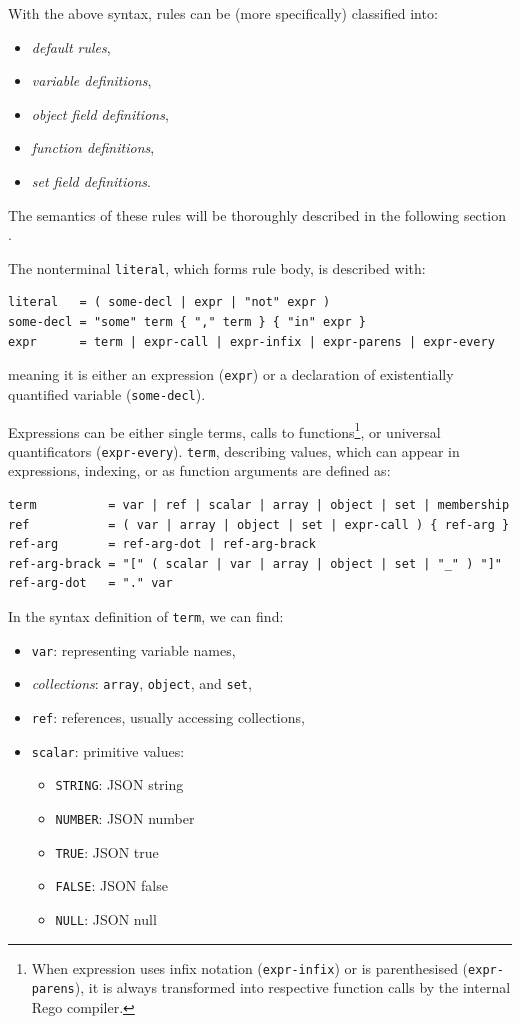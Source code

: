 With the above syntax, rules can be (more specifically) classified into:
\begin{itemize}
  \item \emph{default rules},
  \item \emph{variable definitions},
  \item \emph{object field definitions},
  \item \emph{function definitions},
  \item \emph{set field definitions}.
\end{itemize}
The semantics of these rules will be thoroughly described in the following section .

The nonterminal \texttt{literal}, which forms rule body, is described with:
\begin{lstlisting}
literal   = ( some-decl | expr | "not" expr )
some-decl = "some" term { "," term } { "in" expr }
expr      = term | expr-call | expr-infix | expr-parens | expr-every
\end{lstlisting}
meaning it is either an expression (\texttt{expr}) or a declaration of existentially quantified variable (\texttt{some-decl}).

Expressions can be either single terms, calls to functions\footnote{
  When expression uses infix notation (\texttt{expr-infix}) or is parenthesised (\texttt{expr-parens}), it is always transformed into respective function calls by the internal Rego compiler.
}, or universal quantificators (\texttt{expr-every}).
\texttt{term}, describing values, which can appear in expressions, indexing, or as function arguments are defined as:
\begin{lstlisting}
term          = var | ref | scalar | array | object | set | membership
ref           = ( var | array | object | set | expr-call ) { ref-arg }
ref-arg       = ref-arg-dot | ref-arg-brack
ref-arg-brack = "[" ( scalar | var | array | object | set | "_" ) "]"
ref-arg-dot   = "." var
\end{lstlisting}

In the syntax definition of \texttt{term}, we can find:
\begin{itemize}
  \item \texttt{var}: representing variable names,
  \item \emph{collections}: \texttt{array}, \texttt{object}, and \texttt{set},
  \item \texttt{ref}: references, usually accessing collections,
  \item \texttt{scalar}: primitive values:
    \begin{itemize}
      \item \texttt{STRING}: JSON string
      \item \texttt{NUMBER}: JSON number
      \item \texttt{TRUE}:   JSON true
      \item \texttt{FALSE}:  JSON false
      \item \texttt{NULL}:   JSON null
    \end{itemize}
\end{itemize}

